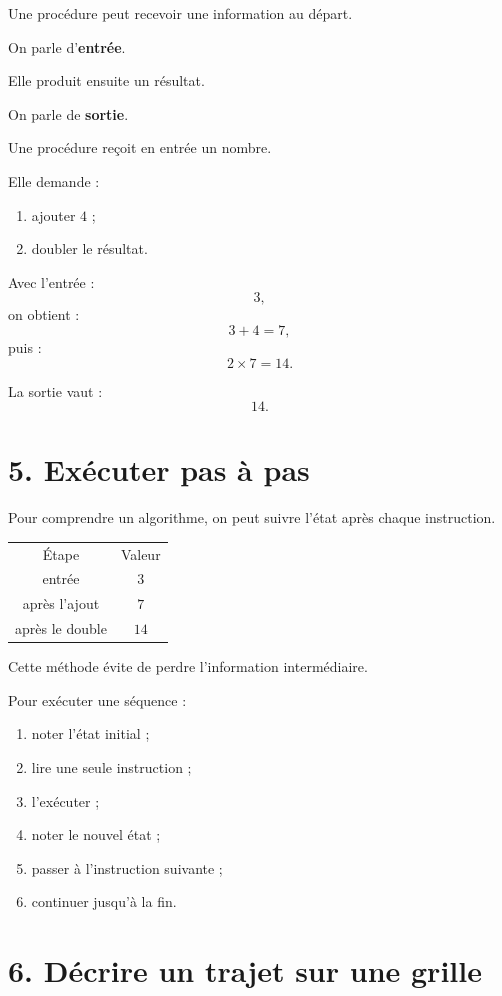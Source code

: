Une procédure peut recevoir une information au départ.

On parle d'\textbf{entrée}.

Elle produit ensuite un résultat.

On parle de \textbf{sortie}.

\begin{exemple}
Une procédure reçoit en entrée un nombre.

Elle demande :
\begin{enumerate}
\item ajouter $4$ ;
\item doubler le résultat.
\end{enumerate}

Avec l'entrée :
\[
3,
\]
on obtient :
\[
3+4=7,
\]
puis :
\[
2\times7=14.
\]

La sortie vaut :
\[
\boxed{14}.
\]
\end{exemple}

\section{5. Exécuter pas à pas}

Pour comprendre un algorithme, on peut suivre l'état après chaque instruction.

\begin{tabular}{c|c}
Étape & Valeur \\
entrée & $3$ \\
après l'ajout & $7$ \\
après le double & $14$ \\
\end{tabular}

Cette méthode évite de perdre l'information intermédiaire.

\begin{methode}
Pour exécuter une séquence :
\begin{enumerate}
\item noter l'état initial ;
\item lire une seule instruction ;
\item l'exécuter ;
\item noter le nouvel état ;
\item passer à l'instruction suivante ;
\item continuer jusqu'à la fin.
\end{enumerate}
\end{methode}

\section{6. Décrire un trajet sur une grille}

